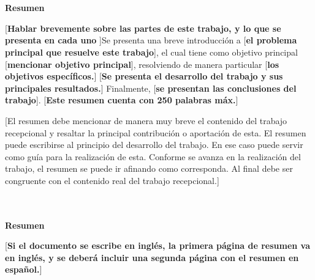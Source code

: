 \thispagestyle{plain}
\begin{fullwidth}
\begin{center}
    \LARGE
    \textcolor{itesodblue}{\textbf{\mytitle}}\\
    \Large
    \vspace{0.4cm}
    \textcolor{itesomblue}{\textbf{\myauthor}}\\
    \vspace{0.9cm}
    \textcolor{itesolblue}{\textbf{Resumen}}
\end{center}

[\textbf{Hablar brevemente sobre las partes de este trabajo, y lo que se presenta en cada uno} ]Se presenta una breve introducción a [\textbf{el problema principal que resuelve este trabajo}], el cual tiene como objetivo principal [\textbf{mencionar objetivo principal}], resolviendo de manera particular [\textbf{los objetivos específicos.}] [\textbf{Se presenta el desarrollo del trabajo y sus principales resultados.}] Finalmente, [\textbf{se presentan las conclusiones del trabajo}]. [\textbf{Este resumen cuenta con 250 palabras máx.}] 

\vspace{2cm}

[El resumen debe mencionar de manera muy breve el contenido del trabajo recepcional y resaltar la principal contribución o aportación de esta. El resumen puede escribirse al principio del desarrollo del trabajo. En ese caso puede servir como guía para la realización de esta. Conforme se avanza en la realización del trabajo, el resumen se puede ir afinando como corresponda. Al final debe ser congruente con el contenido real del trabajo recepcional.]

\clearpage

\vspace{2cm}

\begin{center}
    \LARGE
    \textcolor{itesodblue}{\textbf{\mytitle}}\\
    \Large
    \vspace{0.4cm}
    \textcolor{itesomblue}{\textbf{\myauthor}}\\
    \vspace{0.9cm}
    \textcolor{itesolblue}{\textbf{Resumen}}
\end{center}

[\textbf{Si el documento se escribe en inglés, la primera página de resumen va en inglés, y se deberá incluir una segunda página con el resumen en español.}] 

\end{fullwidth}
